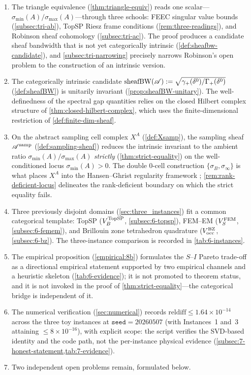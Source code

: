 \begin{enumerate}[leftmargin=*,label=(C\arabic*)]
\item The triangle equivalence (\cref{thm:triangle-equiv}) reads one
  scalar---$\sigma_{\min}(A)/\sigma_{\max}(A)$---through three
  schools: FEEC singular value bounds (\cref{subsec:tri-ab}), TopSP
  Riesz frame conditions (\cref{rem:three-readings}), and Robinson
  sheaf cohomology (\cref{subsec:tri-ac}). The proof produces a
  candidate sheaf bandwidth that is not yet categorically intrinsic
  (\cref{def:sheafbw-candidate}), and \cref{subsec:tri-narrowing}
  precisely narrows Robinson's open problem to the construction of an
  intrinsic version.
\item The categorically intrinsic candidate
  $\operatorname{sheafBW}(\mathscr{A}) := \sqrt{\gamma_+(\delta^0)/\Gamma_+(\delta^0)}$
  (\cref{def:sheafBW}) is unitarily invariant
  (\cref{prop:sheafBW-unitary}). The well-definedness of the
  spectral gap quantities relies on the closed Hilbert complex
  structure of \cref{thm:closed-hilbert-complex}, which uses the
  finite-dimensional restriction of \cref{def:finite-dim-sheaf}.
\item On the abstract sampling cell complex $X^A$
  (\cref{def:Xsamp}), the sampling sheaf $\mathscr{A}^{\mathrm{samp}}$
  (\cref{def:sampling-sheaf}) reduces the intrinsic invariant to the
  ambient ratio $\sigma_{\min}(A)/\sigma_{\max}(A)$ \emph{strictly}
  (\cref{thm:strict-equality}) on the well-conditioned locus
  $\sigma_{\min}(A) > 0$. The double $0$-cell construction
  $\{\sigma_B, \sigma_\infty\}$ is what places $X^A$ into the
  Hansen--Ghrist regularity framework
  \cite[Def.~1, Cond.~4]{HansenGhrist2019};
  \cref{rem:rank-deficient-locus} delineates the rank-deficient
  boundary on which the strict equality fails.
\item Three previously disjoint domains
  (\cref{sec:three_instances}) fit a common categorical template:
  TopSP ($V_B^{\mathrm{TopSP}}$, \cref{subsec:6-topsp}), FEM--EM ($V_S^{\mathrm{FEM}}$,
  \cref{subsec:6-femem}), and Brillouin zone tetrahedron quadrature
  ($V_{\mathrm{occ}}^{\mathrm{BZ}}$, \cref{subsec:6-bz}). The three-instance
  comparison is recorded in \cref{tab:6-instances}.
\item The empirical proposition (\cref{empirical:8b}) formulates the
  $S$--$I$ Pareto trade-off as a directional empirical statement
  supported by two empirical channels and a heuristic skeleton
  (\cref{tab:6-evidence}); it is not promoted to theorem status, and
  it is not invoked in the proof of \cref{thm:strict-equality}---the
  categorical bridge is independent of it.
\item The numerical verification (\cref{sec:numerical}) records
  $\mathrm{reldiff} \le 1.64 \times 10^{-14}$ across the three toy
  instances at $\mathtt{seed} = 20260507$ (with Instances~1 and~3
  attaining $\le 8 \times 10^{-16}$), with explicit scope: the script
  verifies the SVD-based identity and the code path, not the
  per-instance physical evidence
  (\cref{subsec:7-honest-statement,tab:7-evidence}).
\item Two independent open problems remain, formulated below.
\end{enumerate}

